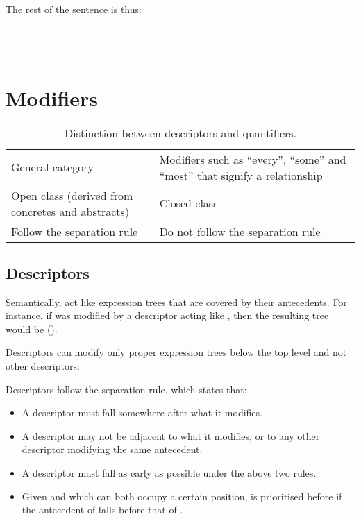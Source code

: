 \documentclass{book}
\begin{document}
The rest of the sentence is thus: \\
~\\
 \\
 \\
     \hlvi{$\lrcorner$} 

\section{Modifiers}


\begin{table}[ht]
  \caption{Distinction between descriptors and quantifiers.}
  \centering
  \begin{tabu} to \textwidth {YY}
     &  \\
    \hline
    General category & Modifiers such as ``every'', ``some'' and ``most'' that signify a relationship \\
    Open class (derived from concretes and abstracts) & Closed class \\
    Follow the separation rule & Do not follow the separation rule
  \end{tabu}
\end{table}

\subsection{Descriptors} \label{subsec:descriptors}

Semantically,  act like expression trees that are covered by their antecedents. For instance, if  was modified by a descriptor acting like , then the resulting tree would be ().

Descriptors can modify only proper expression trees below the top level and not other descriptors.

Descriptors follow the separation rule, which states that:

\begin{itemize}
  \item A descriptor must fall somewhere after what it modifies.
  \item A descriptor may not be adjacent to what it modifies, or to any other descriptor modifying the same antecedent.
  \item A descriptor must fall as early as possible under the above two rules.
  \item Given  and  which can both occupy a certain position,  is prioritised before  if the antecedent of  falls before that of .
\end{itemize}
\end{document}
